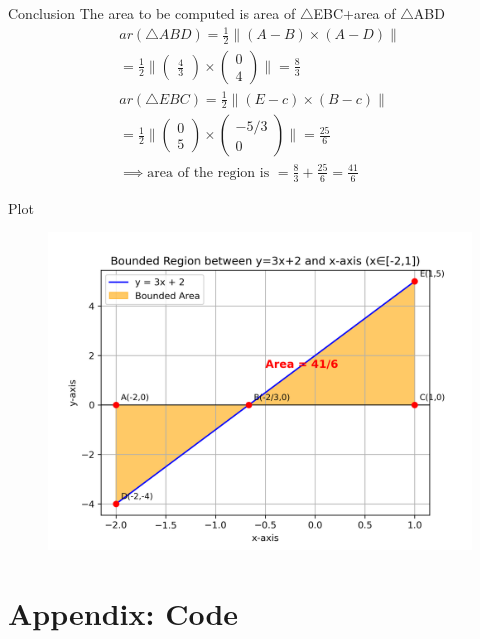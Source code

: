 \documentclass{beamer}
\numberwithin{equation}{section}
\theoremstyle{remark}
\providecommand{\norm}[1]{\lVert#1\rVert}
\newcommand{\myvec}[1]{\ensuremath{\begin{pmatrix}#1\end{pmatrix}}}
\begin{document}
\begin{frame}{Conclusion}
    The area to be computed is area of $\triangle$EBC+area of $\triangle$ABD
\begin{align}
    ar(\triangle ABD)=\frac{1}{2}\norm{(A-B)\times(A-D)}\\
    =\frac{1}{2}\norm{\myvec{\frac{4}{3}}\times\myvec{0\\4}}=\frac{8}{3}\\
     ar(\triangle EBC)=\frac{1}{2}\norm{(E-c)\times(B-c)}\\
    =\frac{1}{2}\norm{\myvec{0\\5}\times\myvec{-5/3\\0}}=\frac{25}{6}\\
    \implies \text{area of the region is }=\frac{8}{3}+\frac{25}{6}=\frac{41}{6}
\end{align} 
\end{frame}

\begin{frame}{Plot}
    \begin{figure}[H]
    \centering
    \includegraphics[width=0.9\columnwidth]{figs/01.png}
    \label{fig-1}
\end{figure}
\end{frame}

\section*{Appendix: Code}
\end{document}
